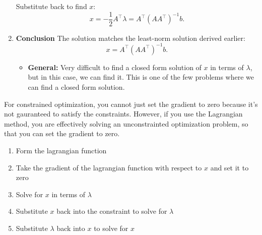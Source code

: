 \begin{derivation}
\begin{enumerate}
        Substitute back to find \(x\):
        \[
        x = -\frac{1}{2} A^\top \lambda = A^\top (A A^\top)^{-1} b.
        \]
        
        \item \textbf{Conclusion} The solution matches the least-norm solution derived earlier:
        \[
        x = A^\top (A A^\top)^{-1} b.
        \]
        \begin{itemize}
            \item \textbf{General:} Very difficult to find a closed form solution of $x$ in terms of $\lambda$, but in this case, we can find it. This is one of the few problems where we can find a closed form solution.
        \end{itemize}
    \end{enumerate}
\end{derivation}

\begin{warning}
    For constrained optimization, you cannot just set the gradient to zero because it's not gauranteed to satisfy the constraints. However, if you use the Lagrangian method, you are effectively solving an unconstrainted optimization problem, so that you can set the gradient to zero.
\end{warning}

\begin{process}
    \begin{enumerate}
        \item Form the lagrangian function
        \item Take the gradient of the lagrangian function with respect to $x$ and set it to zero
        \item Solve for $x$ in terms of $\lambda$
        \item Substitute $x$ back into the constraint to solve for $\lambda$
        \item Substitute $\lambda$ back into $x$ to solve for $x$
    \end{enumerate}
\end{process}

